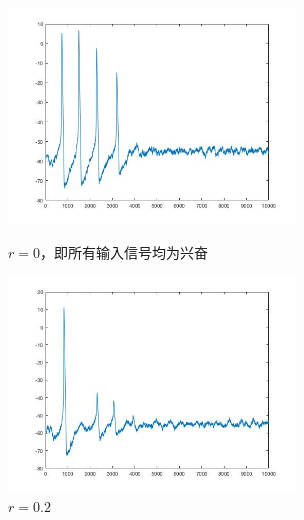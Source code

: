 \documentclass[
pdflinks,
]{xjtuthesis}
\begin{document}
\begin{figure}[!ht]
\begin{minipage}[!ht]{0.5\linewidth}
\centering
\includegraphics[width=3.0in]{figures/p10r0_2.jpg}
\caption{$r=0$，即所有输入信号均为兴奋}
\end{minipage}%
\begin{minipage}[!ht]{0.5\linewidth}
\centering
\includegraphics[width=3.0in]{figures/p10r0_2_2.jpg}
\caption{$r=0.2$}
\end{minipage}
\end{figure}
\end{document}
